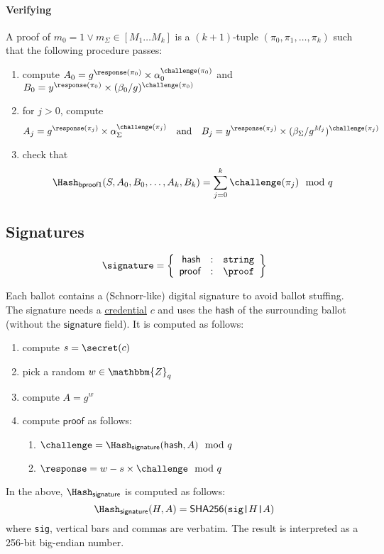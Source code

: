 \documentclass[a4paper]{article}
\newcommand{\Z}{\mathbbm{Z}}
\newcommand{\shatwo}{\textsf{SHA256}}
\newcommand{\jstring}{\texttt{string}}
\begin{document}
\paragraph{Verifying \oproof}
A proof of $m_0=1\lor m_\Sigma\in[M_1\dots M_k]$ is a $(k+1)$-tuple
$(\pi_0,\pi_1,\dotsc,\pi_k)$ such that the following procedure passes:
\begin{enumerate}
\item compute
  $A_0=g^{\response(\pi_0)}\times\alpha_0^{\challenge(\pi_0)}$
  and
  $B_0=y^{\response(\pi_0)}\times(\beta_0/g)^{\challenge(\pi_0)}$
\item for $j>0$, compute
  \[A_j=g^{\response(\pi_j)}\times\alpha_\Sigma^{\challenge(\pi_j)}
  \quad\text{and}\quad
  B_j=y^{\response(\pi_j)}\times(\beta_\Sigma/g^{M_j})^{\challenge(\pi_j)}\]
\item check that
  \[\Hash_{\textsf{bproof1}}(S,A_0,B_0,\dots,A_k,B_k)=\sum_{j=0}^k\challenge(\pi_j)\mod q\]
\end{enumerate}

\subsection{Signatures}
\label{signatures}

\begin{gather*}
  \signature=\left\{
    \begin{array}{rcl}
      \textsf{hash}&:&\jstring\\
      \textsf{proof}&:&\proof
    \end{array}
  \right\}
\end{gather*}

\newcommand{\siglabel}{\textsf{signature}}

Each ballot contains a (Schnorr-like) digital signature to avoid
ballot stuffing. The signature needs a
\hyperref[credentials]{credential} $c$ and uses the $\textsf{hash}$ of
the surrounding ballot (without the $\siglabel$ field). It is computed
as follows:
\begin{enumerate}
\item compute $s=\secret(c)$
\item pick a random $w\in\Z_q$
\item compute $A=g^w$
\item compute $\textsf{proof}$ as follows:
  \begin{enumerate}
  \item $\challenge=\Hash_\siglabel(\textsf{hash},A)\mod q$
  \item $\response=w-s\times\challenge\mod q$
  \end{enumerate}
\end{enumerate}
In the above, $\Hash_\siglabel$ is computed as follows:
\[
\Hash_\siglabel(H,A)=\shatwo(\verb=sig|=H\verb=|=A)
\]
where \verb=sig=, vertical bars and commas are verbatim.
The result is interpreted as a 256-bit big-endian number.
\end{document}
